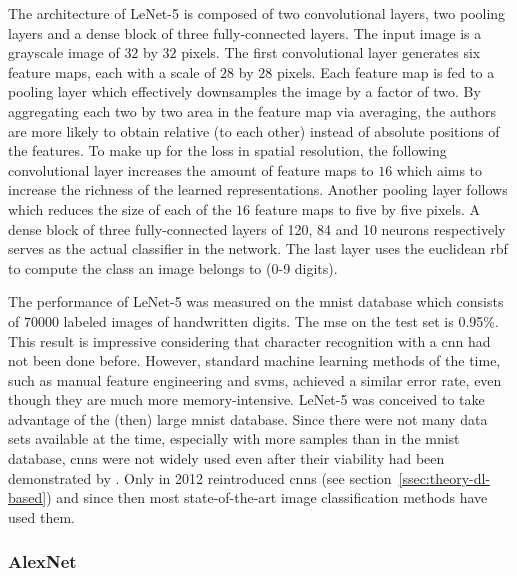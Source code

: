 \documentclass[draft,final]{vutinfth} %
\begin{document}
The architecture of LeNet-5 is composed of two convolutional layers,
two pooling layers and a dense block of three fully-connected
layers. The input image is a grayscale image of $32$ by $32$
pixels. The first convolutional layer generates six feature maps, each
with a scale of $28$ by $28$ pixels. Each feature map is fed to a
pooling layer which effectively downsamples the image by a factor of
two. By aggregating each two by two area in the feature map via
averaging, the authors are more likely to obtain relative (to each
other) instead of absolute positions of the features. To make up for
the loss in spatial resolution, the following convolutional layer
increases the amount of feature maps to $16$ which aims to increase
the richness of the learned representations. Another pooling layer
follows which reduces the size of each of the $16$ feature maps to
five by five pixels. A dense block of three fully-connected layers of
120, 84 and 10 neurons respectively serves as the actual classifier in
the network. The last layer uses the euclidean \gls{rbf} to compute
the class an image belongs to (0-9 digits).

The performance of LeNet-5 was measured on the \gls{mnist} database
which consists of $70000$ labeled images of handwritten digits. The
\gls{mse} on the test set is 0.95\%. This result is impressive
considering that character recognition with a \gls{cnn} had not been
done before. However, standard machine learning methods of the time,
such as manual feature engineering and \glspl{svm}, achieved a similar
error rate, even though they are much more memory-intensive. LeNet-5
was conceived to take advantage of the (then) large \gls{mnist}
database. Since there were not many data sets available at the time,
especially with more samples than in the \gls{mnist} database,
\glspl{cnn} were not widely used even after their viability had been
demonstrated by \textcite{lecun1998}. Only in 2012
\textcite{krizhevsky2012} reintroduced \glspl{cnn} (see
section~\ref{ssec:theory-dl-based}) and since then most
state-of-the-art image classification methods have used them.

\subsubsection{AlexNet}
\label{sssec:theory-alexnet}
\end{document}
